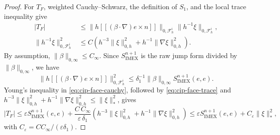 \documentclass[11pt]{article}
\theoremstyle{remark}\newtheorem{remark}{Remark}
\newcommand{\Simex}{S_{\mathrm{IMEX}}}
\newcommand{\eps}{\varepsilon}
\theoremstyle{plain}
\newcommand{\new}[1]{{\color{blue}#1}}
\begin{document}
\begin{proof}
For $T_F$, weighted Cauchy--Schwarz, the definition of $S_1$, and the
local trace inequality give
\begin{align}
|T_F|
&\le \|h[\![(\beta\cdot\nabla)e\times n]\!]\|_{0,\mathcal F_h^i}
\|h^{-1}\xi\|_{0,\mathcal F_h^i},\label{eq:cip-face-cauchy}\\
\|h^{-1}\xi\|_{0,\mathcal F_h^i}^2
&\le C\left(h^{-3}\|\xi\|_{0,h}^2
+h^{-1}\|\nabla\xi\|_{0,h}^2\right).
\label{eq:cip-face-trace}
\end{align}
\new{By assumption}, $\|\beta\|_{0,\infty}\le C_\infty$. Since
$\Simex^{n+1}$ is the raw jump form divided by
$\|\beta\|_{0,\infty}$, we have
 \[
    \|h[\![(\beta\cdot\nabla)e\times n]\!]\|_{0,\mathcal F_h^i}^2\le\delta_1^{-1}\|\beta\|_{0,\infty}\Simex^{n+1}(e,e).
 \]
Young's inequality in \eqref{eq:cip-face-cauchy}, followed by \eqref{eq:cip-face-trace} and \new{$h^{-3}\|\xi\|_{0,h}^2+h^{-1}\|\nabla\xi\|_{0,h}^2\le\|\xi\|_*^2$}, gives
\begin{equation}\label{eq:cip-face-bound}
|T_F|\le \eps\Simex^{n+1}(e,e)
+\frac{C\,C_\infty}{\eps\,\delta_1}
\left(h^{-3}\|\xi\|_{0,h}^2+h^{-1}\|\nabla\xi\|_{0,h}^2\right)
\le \eps\Simex^{n+1}(e,e)+C_\eps\|\xi\|_*^2,
\end{equation}
with \new{$C_\eps=CC_\infty/(\eps\delta_1)$}.


\end{proof}
\end{document}
